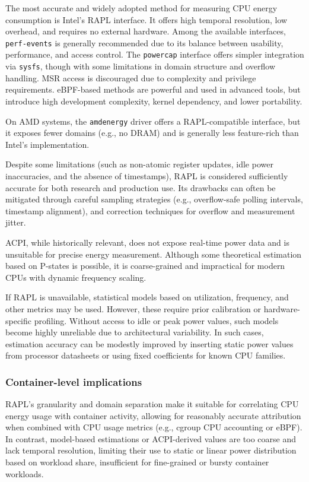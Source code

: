 The most accurate and widely adopted method for measuring CPU energy consumption is Intel's RAPL interface. It offers high temporal resolution, low overhead, and requires no external hardware. Among the available interfaces, \texttt{perf-events} is generally recommended due to its balance between usability, performance, and access control. The \texttt{powercap} interface offers simpler integration via \texttt{sysfs}, though with some limitations in domain structure and overflow handling. MSR access is discouraged due to complexity and privilege requirements. eBPF-based methods are powerful and used in advanced tools, but introduce high development complexity, kernel dependency, and lower portability.

On AMD systems, the \texttt{amd\textunderscore energy} driver offers a RAPL-compatible interface, but it exposes fewer domains (e.g., no DRAM) and is generally less feature-rich than Intel's implementation.

Despite some limitations (such as non-atomic register updates, idle power inaccuracies, and the absence of timestamps), RAPL is considered sufficiently accurate for both research and production use. Its drawbacks can often be mitigated through careful sampling strategies (e.g., overflow-safe polling intervals, timestamp alignment), and correction techniques for overflow and measurement jitter.

ACPI, while historically relevant, does not expose real-time power data and is unsuitable for precise energy measurement. Although some theoretical estimation based on P-states is possible, it is coarse-grained and impractical for modern CPUs with dynamic frequency scaling.

If RAPL is unavailable, statistical models based on utilization, frequency, and other metrics may be used. However, these require prior calibration or hardware-specific profiling. Without access to idle or peak power values, such models become highly unreliable due to architectural variability. In such cases, estimation accuracy can be modestly improved by inserting static power values from processor datasheets or using fixed coefficients for known CPU families.

\subsubsection{Container-level implications}
RAPL’s granularity and domain separation make it suitable for correlating CPU energy usage with container activity, allowing for reasonably accurate attribution when combined with CPU usage metrics (e.g., cgroup CPU accounting or eBPF). In contrast, model-based estimations or ACPI-derived values are too coarse and lack temporal resolution, limiting their use to static or linear power distribution based on workload share, insufficient for fine-grained or bursty container workloads.

